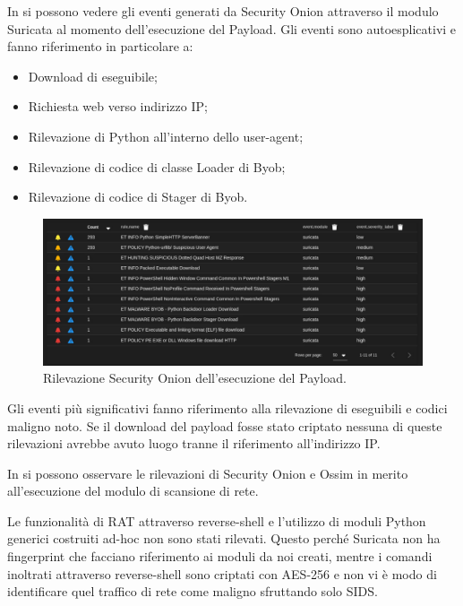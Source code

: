 In  si possono vedere gli eventi generati da Security Onion attraverso il modulo Suricata al momento dell'esecuzione del Payload. Gli eventi sono autoesplicativi e fanno riferimento in particolare a:
\begin{itemize}
    \item Download di eseguibile;
    \item Richiesta web verso indirizzo IP;
    \item Rilevazione di Python all'interno dello user-agent;
    \item Rilevazione di codice di classe Loader di Byob;
    \item Rilevazione di codice di Stager di Byob.
\end{itemize}

\begin{figure}[hbtp]
    \centering
    \includegraphics[width=\textwidth]{res/fig/byob-result-1.png}
    \caption{Rilevazione Security Onion dell'esecuzione del Payload.}
    \label{fig:byob-result-1}
\end{figure}

Gli eventi più significativi fanno riferimento alla rilevazione di eseguibili e codici maligno noto. Se il download del payload fosse stato criptato nessuna di queste rilevazioni   avrebbe avuto luogo tranne il riferimento all'indirizzo IP.

In  si possono osservare le rilevazioni di Security Onion e Ossim in merito all'esecuzione del modulo di scansione di rete.

Le funzionalità di RAT attraverso reverse-shell e l'utilizzo di moduli Python generici costruiti ad-hoc non sono stati rilevati.
Questo perché  Suricata non ha fingerprint che facciano riferimento ai moduli da noi creati, mentre i comandi inoltrati attraverso reverse-shell sono criptati con AES-256 e non vi è modo di identificare quel traffico di rete come maligno sfruttando solo SIDS.

